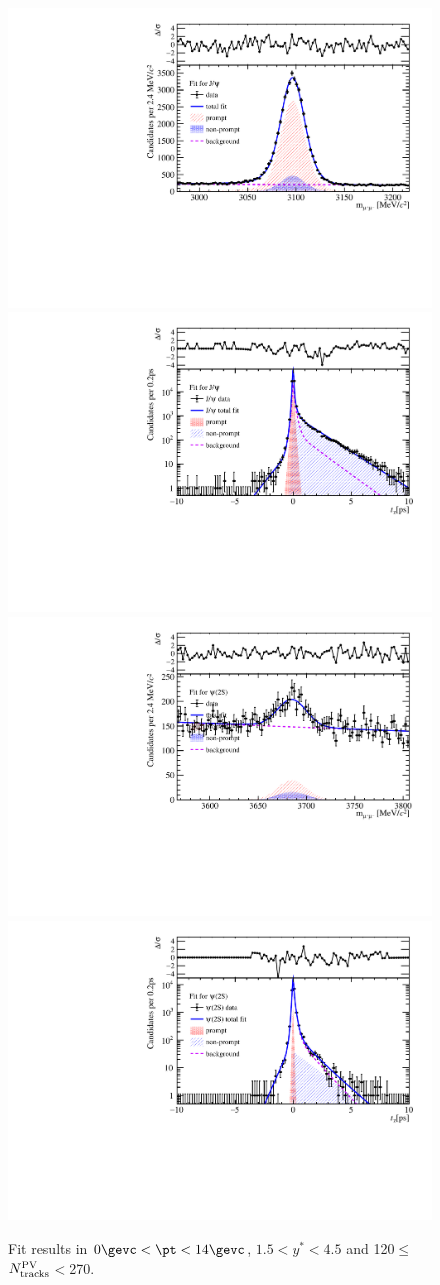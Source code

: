\begin{figure}[H]
\begin{center}
\includegraphics[width=0.45\linewidth]{pdf/pPb/Workdir/TwoDimFit/ProjMass/Jpsi_n5y1pt1.pdf}
\includegraphics[width=0.45\linewidth]{pdf/pPb/Workdir/TwoDimFit/ProjTz/Jpsi_n5y1pt1.pdf}
\vspace*{-0.5cm}
\includegraphics[width=0.45\linewidth]{pdf/pPb/Workdir/TwoDimFit/ProjMass/Psi2S_n5y1pt1.pdf}
\includegraphics[width=0.45\linewidth]{pdf/pPb/Workdir/TwoDimFit/ProjTz/Psi2S_n5y1pt1.pdf}
\vspace*{-0.5cm}
\end{center}
\caption{Fit results in $0\gevc<\pt<14\gevc$, $1.5<y^*<4.5$ and 120$\leq$$N_{\rm tracks}^{\rm PV}$$<$270.}
\end{figure}

